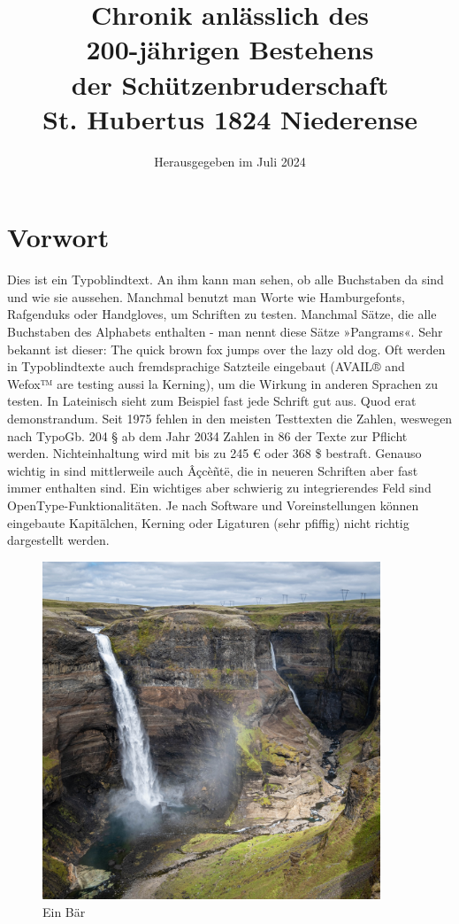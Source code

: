 \documentclass[
a5paper,
10pt, 
onecolumn,
openany,
]{memoir}
\author{}
\title{\sffamily\Huge Chronik anlässlich des\\200-jährigen Bestehens\\der Schützenbruderschaft\\St. Hubertus 1824 Niederense}
\date{\sffamily Herausgegeben im Juli 2024}
\begin{document}
\raggedbottom

\frontmatter

\maketitle



\cleartooddpage

\tableofcontents*

\cleartooddpage

\chapter{Vorwort}

Dies ist ein Typoblindtext. An ihm kann man sehen, ob alle Buchstaben da sind und wie sie aussehen. Manchmal benutzt man Worte wie Hamburgefonts, Rafgenduks oder Handgloves, um Schriften zu testen. Manchmal Sätze, die alle Buchstaben des Alphabets enthalten - man nennt diese Sätze »Pangrams«. Sehr bekannt ist dieser: The quick brown fox jumps over the lazy old dog. Oft werden in Typoblindtexte auch fremdsprachige Satzteile eingebaut (AVAIL® and Wefox™ are testing aussi la Kerning), um die Wirkung in anderen Sprachen zu testen. In Lateinisch sieht zum Beispiel fast jede Schrift gut aus. Quod erat demonstrandum. Seit 1975 fehlen in den meisten Testtexten die Zahlen, weswegen nach TypoGb. 204 § ab dem Jahr 2034 Zahlen in 86 der Texte zur Pflicht werden. Nichteinhaltung wird mit bis zu 245 € oder 368 \$ bestraft. Genauso wichtig in sind mittlerweile auch Âçcèñtë, die in neueren Schriften aber fast immer enthalten sind. Ein wichtiges aber schwierig zu integrierendes Feld sind OpenType-Funktionalitäten. Je nach Software und Voreinstellungen können eingebaute Kapitälchen, Kerning oder Ligaturen (sehr pfiffig) nicht richtig dargestellt werden.

\begin{figure}
  \centering
  \includegraphics[width=0.9\textwidth]{fotos/a}
  \caption{Ein Bär}
\end{figure}
\end{document}
